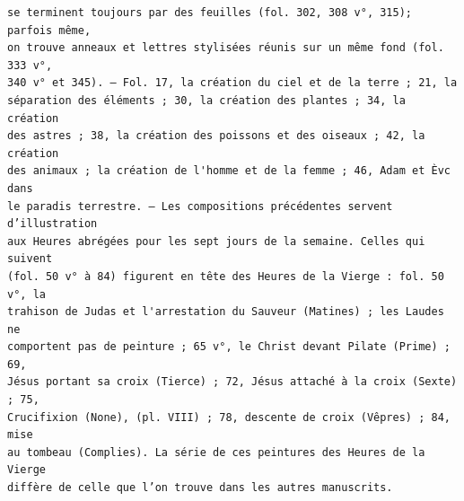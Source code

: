 \documentclass[a4paper,12pt,twoside]{book}
\begin{document}
\begin{verbatim}
se terminent toujours par des feuilles (fol. 302, 308 v°, 315); parfois même,
on trouve anneaux et lettres stylisées réunis sur un même fond (fol. 333 v°, 
340 v° et 345). — Fol. 17, la création du ciel et de la terre ; 21, la
séparation des éléments ; 30, la création des plantes ; 34, la création 
des astres ; 38, la création des poissons et des oiseaux ; 42, la création 
des animaux ; la création de l'homme et de la femme ; 46, Adam et Èvc dans 
le paradis terrestre. — Les compositions précédentes servent d’illustration
aux Heures abrégées pour les sept jours de la semaine. Celles qui suivent 
(fol. 50 v° à 84) figurent en tête des Heures de la Vierge : fol. 50 v°, la
trahison de Judas et l'arrestation du Sauveur (Matines) ; les Laudes ne 
comportent pas de peinture ; 65 v°, le Christ devant Pilate (Prime) ; 69, 
Jésus portant sa croix (Tierce) ; 72, Jésus attaché à la croix (Sexte) ; 75,
Crucifixion (None), (pl. VIII) ; 78, descente de croix (Vêpres) ; 84, mise 
au tombeau (Complies). La série de ces peintures des Heures de la Vierge 
diffère de celle que l’on trouve dans les autres manuscrits.


\end{verbatim}
\end{document}

